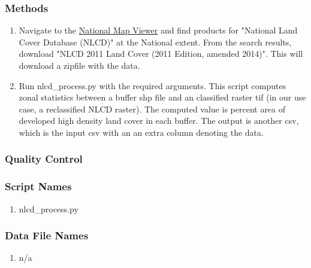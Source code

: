 \subsubsection*{Methods}
\begin{enumerate}
\item Navigate to the \href{https://viewer.nationalmap.gov/basic/}{National Map Viewer} and find products for "National Land Cover Database (NLCD)" at the National extent. From the search results, download "NLCD 2011 Land Cover (2011 Edition, amended 2014)". This will download a zipfile with the data.
\item Run nlcd\_process.py with the required arguments. This script computes zonal statistics between a buffer shp file and an classified raster tif (in our use case, a reclassified NLCD raster). The computed value is percent area of developed high density land cover in each buffer. The output is another csv, which is the input csv with an an extra column denoting the data.
\end{enumerate}
\subsubsection*{Quality Control}
\subsubsection*{Script Names}
\begin{enumerate}
\item nlcd\_process.py
\end{enumerate}
\subsubsection*{Data File Names}
\begin{enumerate}
\item n/a
\end{enumerate}